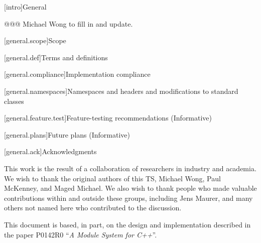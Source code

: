
[intro]{General}

@@@ Michael Wong to fill in and update.

[general.scope]{Scope}

[general.def]{Terms and definitions}

[general.compliance]{Implementation compliance}

[general.namespaces]{Namespaces and headers and modifications to standard classes}

[general.feature.test]{Feature-testing recommendations (Informative)}

[general.plans]{Future plans (Informative)}

[general.ack]{Acknowledgments}

This work is the result of a collaboration of researchers in industry and academia. We wish to thank the
original authors of this TS, Michael Wong, Paul McKenney, and Maged Michael. We also wish to thank people
who made valuable contributions within and outside these groups, including Jens Maurer, and many others not named
here who contributed to the discussion.



\pnum
This document is based, in part, on the design and implementation
described in the paper P0142R0 ``\emph{A Module System for C++}''.
